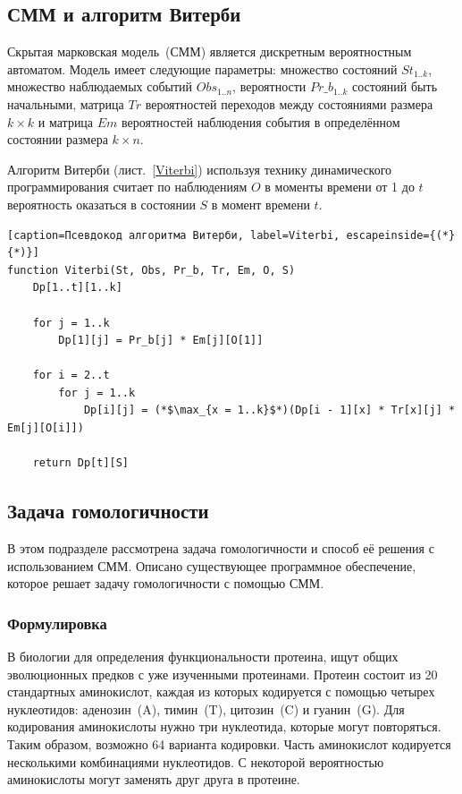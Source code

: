 \subsection{СММ и алгоритм Витерби}
Скрытая марковская модель~(СММ) является дискретным вероятностным автоматом.
Модель имеет следующие параметры: множество состояний $St_{1..k}$, множество 
наблюдаемых событий $Obs_{1..n}$, вероятности $Pr\_b_{1..k}$ состояний быть
начальными, матрица $Tr$ вероятностей переходов между состояниями размера $k
\times k$ и матрица $Em$ вероятностей наблюдения события в определённом 
состоянии размера ${k\times n}$.

Алгоритм Витерби (лист.~\ref{Viterbi}) используя технику динамического 
программирования считает по наблюдениям $O$ в моменты времени от 1 до
$t$ вероятность оказаться в состоянии $S$ в момент времени $t$.

\begin{lstlisting}[caption=Псевдокод алгоритма Витерби, label=Viterbi, escapeinside={(*}{*)}]
function Viterbi(St, Obs, Pr_b, Tr, Em, O, S)
	Dp[1..t][1..k]

	for j = 1..k
		Dp[1][j] = Pr_b[j] * Em[j][O[1]]
	
	for i = 2..t
		for j = 1..k
			Dp[i][j] = (*$\max_{x = 1..k}$*)(Dp[i - 1][x] * Tr[x][j] * Em[j][O[i]])

	return Dp[t][S]
\end{lstlisting}

\subsection{Задача гомологичности}
В этом подразделе рассмотрена задача гомологичности и способ её решения с 
использованием СММ.
Описано существующее программное обеспечение, которое решает задачу
гомологичности с помощью СММ.

\subsubsection{Формулировка}
В биологии для определения функциональности протеина, ищут общих эволюционных
предков с уже изученными протеинами.
Протеин состоит из 20 стандартных аминокислот, каждая из которых кодируется 
с помощью четырех нуклеотидов: аденозин~(A), тимин~(T), цитозин~(C) и 
гуанин~(G).
Для кодирования аминокислоты нужно три нуклеотида, которые могут повторяться.
Таким образом, возможно 64 варианта кодировки.
Часть аминокислот кодируется несколькими комбинациями нуклеотидов.
С некоторой вероятностью аминокислоты могут заменять друг друга в протеине.

